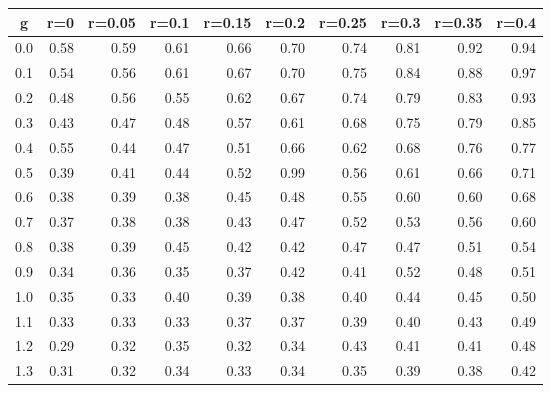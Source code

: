 %
\begin{table}[!tbp]
 \begin{center}
 \begin{tabular}{rrrrrrrrrr}\hline\hline
\multicolumn{1}{c}{g}&\multicolumn{1}{c}{r=0}&\multicolumn{1}{c}{r=0.05}&\multicolumn{1}{c}{r=0.1}&\multicolumn{1}{c}{r=0.15}&\multicolumn{1}{c}{r=0.2}&\multicolumn{1}{c}{r=0.25}&\multicolumn{1}{c}{r=0.3}&\multicolumn{1}{c}{r=0.35}&\multicolumn{1}{c}{r=0.4}\tabularnewline
\hline
0.0&0.58&0.59&0.61&0.66&0.70&0.74&0.81&0.92&0.94\tabularnewline
0.1&0.54&0.56&0.61&0.67&0.70&0.75&0.84&0.88&0.97\tabularnewline
0.2&0.48&0.56&0.55&0.62&0.67&0.74&0.79&0.83&0.93\tabularnewline
0.3&0.43&0.47&0.48&0.57&0.61&0.68&0.75&0.79&0.85\tabularnewline
0.4&0.55&0.44&0.47&0.51&0.66&0.62&0.68&0.76&0.77\tabularnewline
0.5&0.39&0.41&0.44&0.52&0.99&0.56&0.61&0.66&0.71\tabularnewline
0.6&0.38&0.39&0.38&0.45&0.48&0.55&0.60&0.60&0.68\tabularnewline
0.7&0.37&0.38&0.38&0.43&0.47&0.52&0.53&0.56&0.60\tabularnewline
0.8&0.38&0.39&0.45&0.42&0.42&0.47&0.47&0.51&0.54\tabularnewline
0.9&0.34&0.36&0.35&0.37&0.42&0.41&0.52&0.48&0.51\tabularnewline
1.0&0.35&0.33&0.40&0.39&0.38&0.40&0.44&0.45&0.50\tabularnewline
1.1&0.33&0.33&0.33&0.37&0.37&0.39&0.40&0.43&0.49\tabularnewline
1.2&0.29&0.32&0.35&0.32&0.34&0.43&0.41&0.41&0.48\tabularnewline
1.3&0.31&0.32&0.34&0.33&0.34&0.35&0.39&0.38&0.42\tabularnewline
\hline
\end{tabular}

\end{center}

\end{table}

